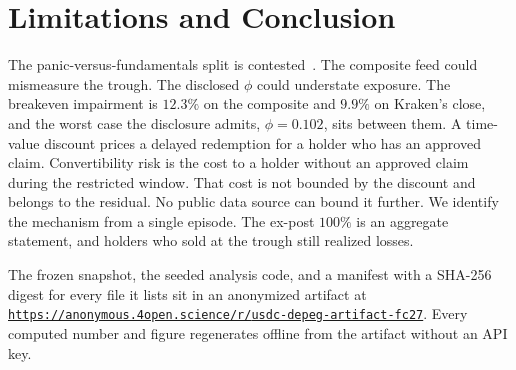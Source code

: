 \section{Limitations and Conclusion}
\label{sec:conc}

The panic-versus-fundamentals split is contested~\cite{anadu2024,watsky2024}. The
composite feed could mismeasure the trough. The disclosed $\phi$ could understate
exposure. The breakeven impairment is $12.3\%$ on the composite and $9.9\%$ on Kraken's
close, and the
worst case the disclosure admits, $\phi=0.102$, sits between them. A time-value discount
prices a delayed
redemption for a holder who has an approved claim. Convertibility risk is the cost to a
holder without an approved claim during the restricted window. That cost is not bounded
by the discount and belongs to the residual. No public data source can bound it further. We identify the mechanism from a
single episode. The ex-post $100\%$ is an aggregate statement, and holders who sold
at the trough still realized losses.

The frozen snapshot, the seeded analysis code, and a manifest with a SHA-256 digest for
every file it lists sit in an anonymized artifact at
\href{https://anonymous.4open.science/r/usdc-depeg-artifact-fc27}%
{\nolinkurl{https://anonymous.4open.science/r/}\mbox{\nolinkurl{usdc-depeg-artifact-fc27}}}.
Every computed number and figure regenerates offline from the
artifact without an API key.

